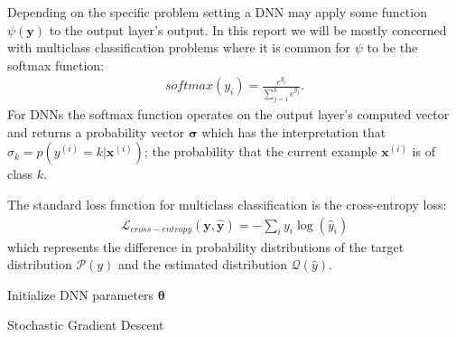 \documentclass[11pt]{article}
\begin{document}
Depending on the specific problem setting a DNN may apply some function $\psi(\textbf{y})$ to the output layer's output.  In this report we will be mostly concerned with multiclass classification problems where it is common for $\psi$ to be the softmax function:
\begin{gather*}
softmax(y_i) = \frac{e^{y_i}}{\sum_{j = 1}^{k} e^{y_j}}.
\end{gather*}
For DNNs the softmax function operates on the output layer's computed vector and returns a probability vector $\boldsymbol{\sigma}$ which has the interpretation that $\sigma_k = p(y^{(i)} = k | \textbf{x}^{(i)})$; the probability that the current example $\textbf{x}^{(i)}$ is of class $k$.  

The standard loss function for multiclass classification is the cross-entropy loss:
\begin{gather*}
\mathcal{L}_{cross-entropy}( \textbf{y}, \hat{\textbf{y}}) = - \sum_{i} y_i \log(\hat{y}_i)
\end{gather*}
which represents the difference in probability distributions of the target distribution $\mathcal{P}(y)$ and the estimated distribution $\mathcal{Q}(\hat{y})$.

\begin{mdframed}[linewidth=.8pt]
	\begin{algorithm}[H]
		Initialize DNN parameters $\boldsymbol{\theta}$ \\
		\caption{Stochastic Gradient Descent}
	\end{algorithm}
\end{mdframed}
\end{document}
